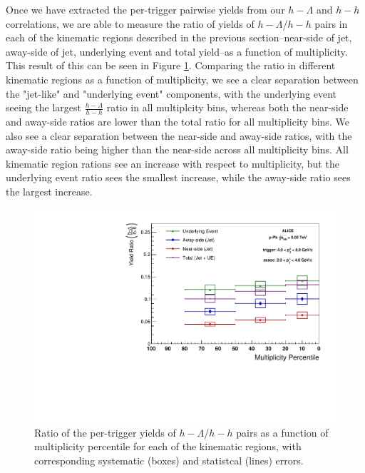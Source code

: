 \documentclass[ALICE,manyauthors]{ALICE_analysis_notes}
\begin{document}
Once we have extracted the per-trigger pairwise yields from our $h-\Lambda$ and $h-h$ correlations, we are able to measure the ratio of yields of $h-\Lambda$/$h-h$ pairs in each of the kinematic regions described in the previous section--near-side of jet, away-side of jet, underlying event and total yield--as a function of multiplicity. This result of this can be seen in Figure \ref{ratioplot}. Comparing the ratio in different kinematic regions as a function of multiplicity, we see a clear separation between the "jet-like" and "underlying event" components, with the underlying event seeing the largest $\frac{h-\Lambda}{h-h}$ ratio in all multiplcity bins, whereas both the near-side and away-side ratios are lower than the total ratio for all multiplicity bins. We also see a clear separation between the near-side and away-side ratios, with the away-side ratio being higher than the near-side across all multiplicity bins. All kinematic region rations see an increase with respect to multiplicity, but the underlying event ratio sees the smallest increase, while the away-side ratio sees the largest increase.


\begin{figure}[ht]
\centering
\includegraphics[width=6in]{figures/ratio_plot.pdf}
\caption{Ratio of the per-trigger yields of $h-\Lambda$/$h-h$ pairs as a function of multiplicity percentile for each of the kinematic regions, with corresponding systematic (boxes) and statistcal (lines) errors. }
\label{ratioplot}
\end{figure}
\end{document}
